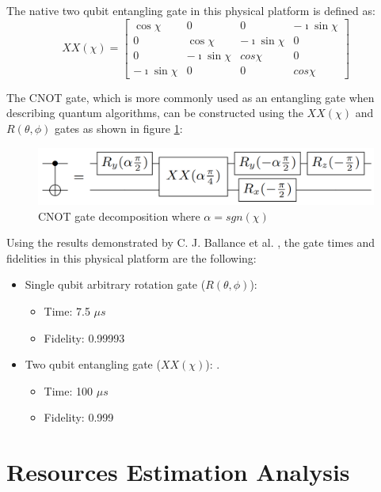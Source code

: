 The native two qubit entangling gate\cite{3QubitGroverSearch_2017} in this physical platform is defined as:
$$XX(\chi)=\left[\begin{array}{cccc}\cos{\chi} & 0 & 0 & -\imath\sin{\chi} \\ 0 & \cos{\chi} & -\imath\sin{\chi} & 0 \\ 0 & -\imath\sin{\chi} & cos{\chi} & 0 \\ -\imath\sin{\chi} & 0 & 0 & cos{\chi}\end{array}\right]$$

The CNOT gate, which is more commonly used as an entangling gate when describing quantum algorithms, can be constructed using the $XX(\chi)$ and $R(\theta,\phi)$ gates as shown in figure \ref{fig:CNOTGate}:

\begin{figure}[h!]
    \centering
    \includegraphics[scale=.35]{images/TrappedIons-CNOTGate.png}
    \caption{CNOT gate \cite{3QubitGroverSearch_2017} decomposition where $\alpha=sgn(\chi)$}
    \label{fig:CNOTGate}
\end{figure}

Using the results demonstrated by C. J. Ballance et al. \cite{TrappedIonHyperfineQubits_2016}, the gate times and fidelities in this physical platform are the following:
\begin{itemize}[noitemsep,nolistsep]
    \item Single qubit arbitrary rotation gate ($R(\theta,\phi)$):
    \begin{itemize}[noitemsep,nolistsep]
        \item Time: 7.5 $\mu s$
        \item Fidelity: 0.99993
    \end{itemize}
    \item Two qubit entangling gate ($XX(\chi)$): .
    \begin{itemize}[noitemsep,nolistsep]
        \item Time: 100 $\mu s$
        \item Fidelity: 0.999
    \end{itemize}
\end{itemize}

\section{Resources Estimation Analysis}

